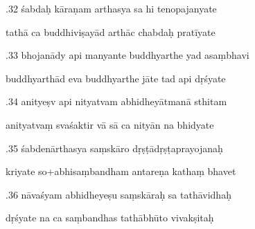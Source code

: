 \documentclass[article,12pt,a4paper]{memoir}%
\newcounter{parCount}
\begin{document}
	  
	  \pstart {}.32 śabdaḥ kāraṇam arthasya sa hi tenopajanyate 
	{}
	\pend%
      

	  
	  \pstart \leavevmode%
	tathā ca buddhiviṣayād arthāc chabdaḥ pratīyate 
	{}
	\pend%
      

	  
	  \pstart {}.33 bhojanādy api manyante buddhyarthe yad asaṃbhavi 
	{}
	\pend%
      

	  
	  \pstart \leavevmode%
	buddhyarthād eva buddhyarthe jāte tad api dṛśyate 
	{}
	\pend%
      

	  
	  \pstart {}.34 anityeṣv api nityatvam abhidheyātmanā sthitam 
	{}
	\pend%
      

	  
	  \pstart \leavevmode%
	anityatvaṃ svaśaktir vā sā ca nityān na bhidyate 
	{}
	\pend%
      

	  
	  \pstart {}.35 śabdenārthasya saṃskāro dṛṣṭādṛṣṭaprayojanaḥ 
	{}
	\pend%
      

	  
	  \pstart \leavevmode%
	kriyate so+abhisaṃbandham antareṇa kathaṃ bhavet 
	{}
	\pend%
      

	  
	  \pstart {}.36 nāvaśyam abhidheyeṣu saṃskāraḥ sa tathāvidhaḥ 
	{}
	\pend%
      

	  
	  \pstart \leavevmode%
	dṛśyate na ca saṃbandhas tathābhūto vivakṣitaḥ 
	{}
	\pend%
      
\end{document}
